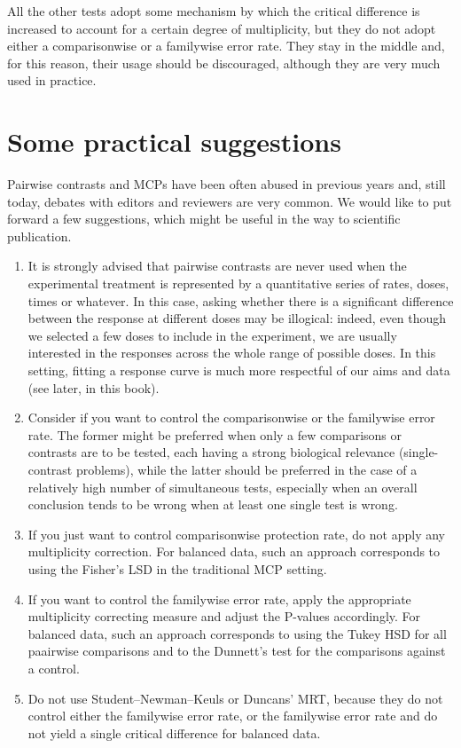 \documentclass[a4paper,12pt,oneside]{book}
\providecommand{\tightlist}{%
  \setlength{\itemsep}{0pt}\setlength{\parskip}{0pt}}
\begin{document}
All the other tests adopt some mechanism by which the critical difference is increased to account for a certain degree of multiplicity, but they do not adopt either a comparisonwise or a familywise error rate. They stay in the middle and, for this reason, their usage should be discouraged, although they are very much used in practice.

\hypertarget{some-practical-suggestions}{%
\section{Some practical suggestions}\label{some-practical-suggestions}}

Pairwise contrasts and MCPs have been often abused in previous years and, still today, debates with editors and reviewers are very common. We would like to put forward a few suggestions, which might be useful in the way to scientific publication.

\begin{enumerate}
\def\labelenumi{\arabic{enumi}.}
\tightlist
\item
  It is strongly advised that pairwise contrasts are never used when the experimental treatment is represented by a quantitative series of rates, doses, times or whatever. In this case, asking whether there is a significant difference between the response at different doses may be illogical: indeed, even though we selected a few doses to include in the experiment, we are usually interested in the responses across the whole range of possible doses. In this setting, fitting a response curve is much more respectful of our aims and data (see later, in this book).
\item
  Consider if you want to control the comparisonwise or the familywise error rate. The former might be preferred when only a few comparisons or contrasts are to be tested, each having a strong biological relevance (single-contrast problems), while the latter should be preferred in the case of a relatively high number of simultaneous tests, especially when an overall conclusion tends to be wrong when at least one single test is wrong.
\item
  If you just want to control comparisonwise protection rate, do not apply any multiplicity correction. For balanced data, such an approach corresponds to using the Fisher's LSD in the traditional MCP setting.
\item
  If you want to control the familywise error rate, apply the appropriate multiplicity correcting measure and adjust the P-values accordingly. For balanced data, such an approach corresponds to using the Tukey HSD for all paairwise comparisons and to the Dunnett's test for the comparisons against a control.
\item
  Do not use Student--Newman--Keuls or Duncans' MRT, because they do not control either the familywise error rate, or the familywise error rate and do not yield a single critical difference for balanced data.
\end{enumerate}
\end{document}
